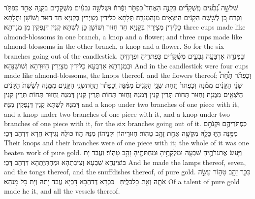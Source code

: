 {שְׁלֹשָׁ֣ה גְ֠בִעִ֠ים מְֽשֻׁקָּדִ֞ים בַּקָּנֶ֣ה הָאֶחָד֮ כַּפְתֹּ֣ר וָפֶ֒רַח֒ וּשְׁלֹשָׁ֣ה גְבִעִ֗ים מְשֻׁקָּדִ֛ים בְּקָנֶ֥ה אֶחָ֖ד כַּפְתֹּ֣ר וָפָ֑רַח כֵּ֚ן לְשֵׁ֣שֶׁת הַקָּנִ֔ים הַיֹּצְאִ֖ים מִן\maqqaf הַמְּנֹרָֽה׃}
{תְּלָתָא כַלִּידִין מְצָיְרִין בְּקַנְיָא חַד חַזּוּר וְשׁוֹשָׁן וּתְלָתָא כַלִּידִין מְצָיְרִין בְּקַנְיָא חַד חַזּוּר וְשׁוֹשָׁן כֵּן לְשִׁתָּא קְנִין דְּנָפְקִין מִן מְנָרְתָא׃}
{three cups made like almond-blossoms in one branch, a knop and a flower; and three cups made like almond-blossoms in the other branch, a knop and a flower. So for the six branches going out of the candlestick.}{}
{וּבַמְּנֹרָ֖ה אַרְבָּעָ֣ה גְבִעִ֑ים מְשֻׁ֨קָּדִ֔ים כַּפְתֹּרֶ֖יהָ וּפְרָחֶֽיהָ׃}
{וּבִמְנָרְתָא אַרְבְּעָא כַלִּידִין מְצָיְרִין חַזּוּרַהָא וְשׁוֹשַׁנַּהָא׃}
{And in the candlestick were four cups made like almond-blossoms, the knops thereof, and the flowers thereof;}{}
{וְכַפְתֹּ֡ר תַּ֩חַת֩ שְׁנֵ֨י הַקָּנִ֜ים מִמֶּ֗נָּה וְכַפְתֹּר֙ תַּ֣חַת שְׁנֵ֤י הַקָּנִים֙ מִמֶּ֔נָּה וְכַפְתֹּ֕ר תַּֽחַת\maqqaf שְׁנֵ֥י הַקָּנִ֖ים מִמֶּ֑נָּה לְשֵׁ֙שֶׁת֙ הַקָּנִ֔ים הַיֹּצְאִ֖ים מִמֶּֽנָּה׃}
{וְחַזּוּר תְּחוֹת תְּרֵין קְנִין דְּמִנַּהּ וְחַזּוּר תְּחוֹת תְּרֵין קְנִין דְּמִנַּהּ וְחַזּוּר תְּחוֹת תְּרֵין קְנִין דְּמִנַּהּ לְשִׁתָּא קְנִין דְּנָפְקִין מִנַּהּ׃}
{and a knop under two branches of one piece with it, and a knop under two branches of one piece with it, and a knop under two branches of one piece with it, for the six branches going out of it.}{}
{כַּפְתֹּרֵיהֶ֥ם וּקְנֹתָ֖ם מִמֶּ֣נָּה הָי֑וּ כֻּלָּ֛הּ מִקְשָׁ֥ה אַחַ֖ת זָהָ֥ב טָהֽוֹר׃}
{חַזּוּרֵיהוֹן וּקְנֵיהוֹן מִנַּהּ הֲווֹ כּוּלַּהּ נְגִידָא חֲדָא דִּדְהַב דְּכֵי׃}
{Their knops and their branches were of one piece with it; the whole of it was one beaten work of pure gold.}{}
{וַיַּ֥עַשׂ אֶת\maqqaf נֵרֹתֶ֖יהָ שִׁבְעָ֑ה וּמַלְקָחֶ֥יהָ וּמַחְתֹּתֶ֖יהָ זָהָ֥ב טָהֽוֹר׃}
{וַעֲבַד יָת בּוֹצִינַהָא שִׁבְעָא וְצֵיבְתַהָא וּמַחְתְּיָתַהָא דִּדְהַב דְּכֵי׃}
{And he made the lamps thereof, seven, and the tongs thereof, and the snuffdishes thereof, of pure gold.}{}
{כִּכָּ֛ר זָהָ֥ב טָה֖וֹר עָשָׂ֣ה אֹתָ֑הּ וְאֵ֖ת כׇּל\maqqaf כֵּלֶֽיהָ׃ \petucha }
{כַּכְּרָא דְּדַהְבָּא דָּכְיָא עֲבַד יָתַהּ וְיָת כָּל מָנַהָא׃}
{Of a talent of pure gold made he it, and all the vessels thereof.}{}
